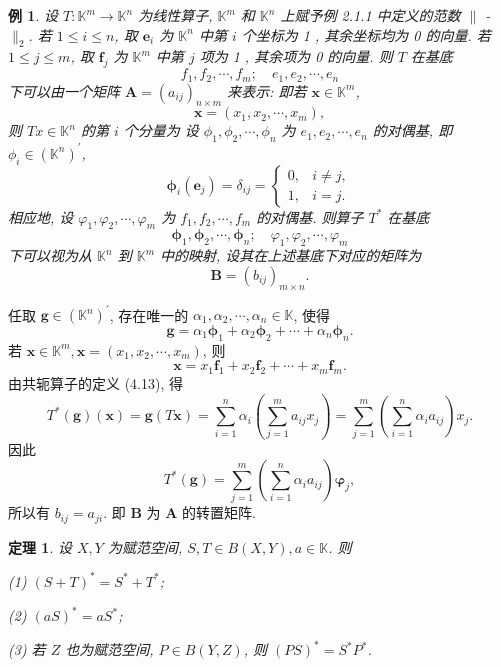 \documentclass[openany]{ctexbook}
\theoremstyle{kaiti}
\newtheorem{theorem}{定理}[section]
\theoremstyle{normal}
\newtheorem{example}{例}[section]
\begin{document}
\begin{example}
设 $T: \mathbb{K}^m \rightarrow \mathbb{K}^n$ 为线性算子, $\mathbb{K}^m$ 和 $\mathbb{K}^n$ 上赋予例 2.1.1 中定义的范数 $\|$ - $\|_2$. 若 $1 \leqslant i \leqslant n$, 取 $\boldsymbol{e}_{i}$ 为 $\mathbb{K}^n$ 中第 $i$ 个坐标为 1 , 其余坐标均为 0 的向量. 若 $1 \leqslant j \leqslant m$, 取 $\boldsymbol{f}_{j}$ 为 $\mathbb{K}^m$ 中第 $j$ 项为 1 , 其余项为 0 的向量. 则 $T$ 在基底
$$
f_1, f_2, \cdots, f_m ; \quad e_1, e_2, \cdots, e_n
$$
下可以由一个矩阵 $\boldsymbol{A}=\left(a_{i j}\right)_{n \times m}$ 来表示: 即若 $\boldsymbol{x} \in \mathbb{K}^m$,
$$
\boldsymbol{x}=\left(x_1, x_2, \cdots, x_m\right),
$$
则 $T x \in \mathbb{K}^n$ 的第 $i$ 个分量为
设 $\phi_1, \phi_2, \cdots, \phi_n$ 为 $e_1, e_2, \cdots, e_n$ 的对偶基, 即 $\phi_{i} \in\left(\mathbb{K}^n\right)^{\prime}$,
$$
\boldsymbol{\phi}_{i}\left(\boldsymbol{e}_{j}\right)=\delta_{i j}= \begin{cases}0, & i \neq j, \\ 1, & i=j.\end{cases}
$$
相应地, 设 $\varphi_1, \varphi_2, \cdots, \varphi_m$ 为 $f_1, f_2, \cdots, f_m$ 的对偶基. 则算子 $T^{*}$ 在基底
$$
\boldsymbol{\phi}_1, \boldsymbol{\phi}_2, \cdots, \boldsymbol{\phi}_n ; \quad \varphi_1, \varphi_2, \cdots, \varphi_m
$$
下可以视为从 $\mathbb{K}^n$ 到 $\mathbb{K}^m$ 中的映射, 设其在上述基底下对应的矩阵为
$$
\boldsymbol{B}=\left(b_{i j}\right)_{m \times n}.
$$
\end{example}

任取 $\boldsymbol{g} \in\left(\mathbb{K}^n\right)^{\prime}$, 存在唯一的 $\alpha_1, \alpha_2, \cdots, \alpha_n \in \mathbb{K}$, 使得
$$
\boldsymbol{g}=\alpha_1 \boldsymbol{\phi}_1+\alpha_2 \boldsymbol{\phi}_2+\cdots+\alpha_n \boldsymbol{\phi}_n.
$$
若 $\boldsymbol{x} \in \mathbb{K}^m, \boldsymbol{x}=\left(x_1, x_2, \cdots, x_m\right)$, 则
$$
\boldsymbol{x}=x_1 \boldsymbol{f}_1+x_2 \boldsymbol{f}_2+\cdots+x_m \boldsymbol{f}_m.
$$
由共轭算子的定义 (4.13), 得
$$
T^{*}(\boldsymbol{g})(\boldsymbol{x})=\boldsymbol{g}(T \boldsymbol{x})=\sum_{i=1}^n \alpha_{i}\left(\sum_{j=1}^m a_{i j} x_{j}\right)=\sum_{j=1}^m\left(\sum_{i=1}^n \alpha_{i} a_{i j}\right) x_{j}.
$$
因此
$$
T^{*}(\boldsymbol{g})=\sum_{j=1}^m\left(\sum_{i=1}^n \alpha_{i} a_{i j}\right) \boldsymbol{\varphi}_{j},
$$
所以有 $b_{i j}=a_{j i}$. 即 $\boldsymbol{B}$ 为 $\boldsymbol{A}$ 的转置矩阵.

\begin{theorem}
设 $X, Y$ 为赋范空间, $S, T \in B(X, Y), a \in \mathbb{K}$. 则

(1) $(S+T)^{*}=S^{*}+T^{*}$;

(2) $(a S)^{*}=a S^{*}$;

(3) 若 $Z$ 也为赋范空间, $P \in B(Y, Z)$, 则 $(P S)^{*}=S^{*} P^{*}$.
\end{theorem}
\end{document}
